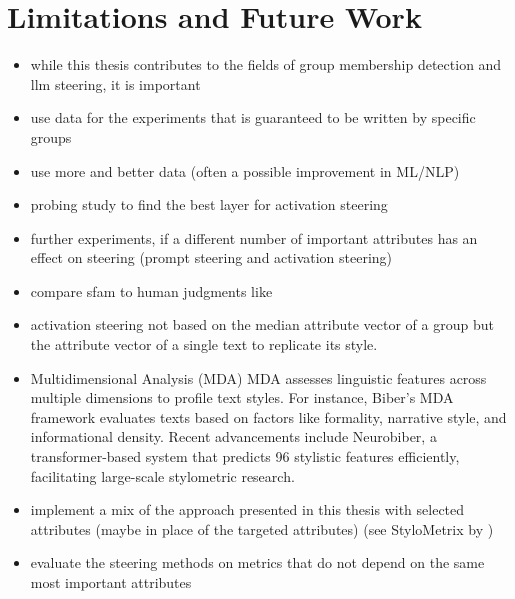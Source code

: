 \section{Limitations and Future Work}
\begin{itemize}
  \item while this thesis contributes to the fields of group membership detection and \ac{llm} steering, it is important
\end{itemize}
\begin{itemize}
  \item use data for the experiments that is guaranteed to be written by specific groups
  \item use more and better data (often a possible improvement in ML/NLP)
  \item probing study to find the best layer for activation steering
  \item further experiments, if a different number of important attributes has an effect on steering (prompt steering and activation steering)
  \item compare \ac{sfam} to human judgments like \citet{patelLearningInterpretableStyle2023}
  \item activation steering not based on the median attribute vector of a group but the attribute vector of a single text to replicate its style.
  \item Multidimensional Analysis (MDA) \newline
        MDA assesses linguistic features across multiple dimensions to profile text styles. For instance, Biber's MDA framework evaluates texts based on factors like formality, narrative style, and informational density. Recent advancements include Neurobiber, a transformer-based system that predicts 96 stylistic features efficiently, facilitating large-scale stylometric research.
  \item implement a mix of the approach presented in this thesis with selected attributes (maybe in place of the targeted attributes) (see StyloMetrix by \citet{okulskaStyloMetrixOpensourceMultilingual2023})
  \item evaluate the steering methods on metrics that do not depend on the same most important attributes
\end{itemize}
